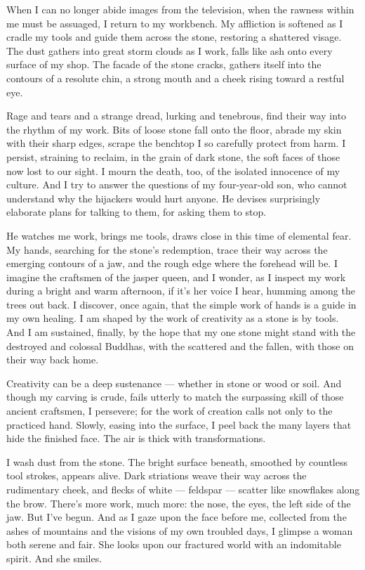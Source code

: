 \documentclass[letterpaper,oneside]{memoir}
\begin{document}
\begin{description}
When I can no longer abide images from the television, when the rawness within me must be assuaged, I return to my workbench. My affliction is softened as I cradle my tools and guide them across the stone, restoring a shattered visage. The dust gathers into great storm clouds as I work, falls like ash onto every surface of my shop. The facade of the stone cracks, gathers itself into the contours of a resolute chin, a strong mouth and a cheek rising toward a restful eye.

Rage and tears and a strange dread, lurking and tenebrous, find their way into the rhythm of my work. Bits of loose stone fall onto the floor, abrade my skin with their sharp edges, scrape the benchtop I so carefully protect from harm. I persist, straining to reclaim, in the grain of dark stone, the soft faces of those now lost to our sight. I mourn the death, too, of the isolated innocence of my culture. And I try to answer the questions of my four-year-old son, who cannot understand why the hijackers would hurt anyone. He devises surprisingly elaborate plans for talking to them, for asking them to stop.

He watches me work, brings me tools, draws close in this time of elemental fear. My hands, searching for the stone's redemption, trace their way across the emerging contours of a jaw, and the rough edge where the forehead will be. I imagine the craftsmen of the jasper queen, and I wonder, as I inspect my work during a bright and warm afternoon, if it's her voice I hear, humming among the trees out back. I discover, once again, that the simple work of hands is a guide in my own healing. I am shaped by the work of creativity as a stone is by tools. And I am sustained, finally, by the hope that my one stone might stand with the destroyed and colossal Buddhas, with the scattered and the fallen, with those on their way back home.

Creativity can be a deep sustenance --- whether in stone or wood or soil. And though my carving is crude, fails utterly to match the surpassing skill of those ancient craftsmen, I persevere; for the work of creation calls not only to the practiced hand. Slowly, easing into the surface, I peel back the many layers that hide the finished face. The air is thick with transformations.

I wash dust from the stone. The bright surface beneath, smoothed by countless tool strokes, appears alive. Dark striations weave their way across the rudimentary cheek, and flecks of white --- feldspar --- scatter like snowflakes along the brow. There's more work, much more: the nose, the eyes, the left side of the jaw. But I've begun. And as I gaze upon the face before me, collected from the ashes of mountains and the visions of my own troubled days, I glimpse a woman both serene and fair. She looks upon our fractured world with an indomitable spirit. And she smiles.\\
\newpage

\end{description}
\end{document}
